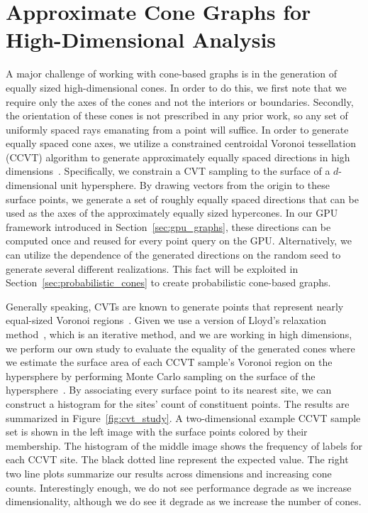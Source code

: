 \section{Approximate Cone Graphs for High-Dimensional Analysis}

A major challenge of working with cone-based graphs is in the generation of equally sized high-dimensional cones.
%
In order to do this, we first note that we require only the axes of the cones and not the interiors or boundaries.
%
Secondly, the orientation of these cones is not prescribed in any prior work, so any set of uniformly spaced rays emanating from a point will suffice.
%
In order to generate equally spaced cone axes, we utilize a constrained centroidal Voronoi tessellation (CCVT) algorithm to generate approximately equally spaced directions in high dimensions~\cite{DuGunzburgerJu2003}.
%
Specifically, we constrain a CVT sampling to the surface of a $d$-dimensional unit hypersphere.
%
By drawing vectors from the origin to these surface points, we generate a set of roughly equally spaced directions that can be used as the axes of the approximately equally sized hypercones.
%
In our GPU framework introduced in Section~\ref{sec:gpu_graphs}, these directions can be computed once and reused for every point query on the GPU.
%
Alternatively, we can utilize the dependence of the generated directions on the random seed to generate several different realizations.
%
This fact will be exploited in Section~\ref{sec:probabilistic_cones} to create probabilistic cone-based graphs.

Generally speaking, CVTs are known to generate points that represent nearly equal-sized Voronoi
regions~\cite{HesseSloanWomersley2015,PeyreCohen2004}.
%
Given we use a version of Lloyd's relaxation method~\cite{DuGunzburgerJu2003}, which is an iterative method, and we are working in high dimensions, we perform our own study to evaluate the equality of the generated cones where we estimate the surface area of each CCVT sample's Voronoi region on the hypersphere by performing Monte Carlo sampling on the surface of the hypersphere~\cite{HarmanLacko2010,HicksWheeling1959}.
%
By associating every surface point to its nearest site, we can construct a histogram for the sites' count of constituent points.
%
The results are summarized in Figure~\ref{fig:cvt_study}.
%
A two-dimensional example CCVT sample set is shown in the left image with the surface points colored by their membership.
%
The histogram of the middle image shows the frequency of labels for each CCVT site.
%
The black dotted line represent the expected value.
%
The right two line plots summarize our results across dimensions and increasing cone counts.
%
Interestingly enough, we do not see performance degrade as we increase dimensionality, although we do see it degrade as we increase the number of cones.

